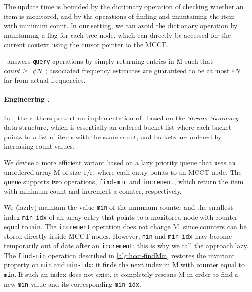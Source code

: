 The update time is bounded by the dictionary operation of checking whether an item is monitored, and by the operations of finding and maintaining the item with minimum count. In our setting, we can avoid the dictionary operation by maintaining a flag for each tree node, which can directly be accessed for the current context using the cursor pointer to the MCCT.

\spacesaving\ answers {\tt query} operations by simply returning entries in M such that $count \geq \lfloor\phi N\rfloor$; associated frequency estimates are guaranteed to be at most $\varepsilon N$ far from actual frequencies.

\paragraph*{Engineering \spacesaving.} In~\cite{Metwally06}, the authors present an implementation of \spacesaving\ based on the {\em Stream-Summary} data structure, which is essentially an ordered bucket list where each bucket points to a list of items with the same count, and buckets are ordered by increasing count values.

\noindent We devise a more efficient variant based on a lazy priority queue that uses an unordered array M of size $1/\varepsilon$, where each entry points to an MCCT node. The queue supports two operations, {\tt find-min} and {\tt increment}, which return the item with minimum count and increment a counter, respectively.

We (lazily) maintain the value {\tt min} of the minimum counter and the smallest index {\tt min-idx} of an array entry that points to a monitored node with counter equal to {\tt min}. The {\tt increment} operation does not change M, since counters can be stored directly inside MCCT nodes. However, {\tt min} and {\tt min-idx} may become temporarily out of date after an {\tt increment}: this is why we call the approach lazy. The {\tt find-min} operation described in \myalgorithm\ref{alg:hcct-findMin} restores the invariant property on {\tt min} and {\tt min-idx}: it finds the next index in M with counter equal to {\tt min}. If such an index does not exist, it completely rescans M in order to find a new {\tt min} value and its corresponding {\tt min-idx}.

